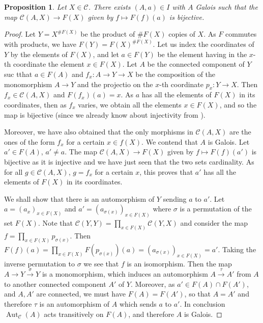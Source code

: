 \documentclass[10pt]{article}
\theoremstyle{thmstyle}
\newtheorem{proposition}[theorem]{Proposition}
\theoremstyle{defstyle}
\newcommand{\Aut}{\operatorname{Aut}}
\newcommand{\scrC}{\mathscr{C}} %
\begin{document}
\begin{proposition}
    Let $X\in\scrC$. There exists $(A, a)\in I$ with $A$ Galois such that the map $\scrC(A, X)\to F(X)$ given by $f\mapsto F(f)(a)$ is bijective.
\end{proposition}
\begin{proof}
    Let $Y = X^{\# F(X)}$ be the product of $\# F(X)$ copies of $X$. As $F$ commutes with products, we have $F(Y) = F(X)^{\# F(X)}$. Let us index the coordinates of $Y$ by the elements of $F(X)$, and let $a\in F(Y)$ be the element having in the $x$-th coordinate the element $x\in F(X)$. Let $A$ be the connected component of $Y$ suc tthat $a\in F(A)$ and $f_x: A\to Y\to X$ be the composition of the monomorphism $A\to Y$ and the projectio on the $x$-th coordinate $p_x: Y\to X$. Then $f_x\in\scrC(A, X)$ and $F(f_x)(a) = x$. As $a$ has all the elements of $F(X)$ in its coordinates, then as $f_x$ varies, we obtain all the elements $x\in F(X)$, and so the map is bijective (since we already know about injectivity from ).

    Moreover, we have also obtained that the only morphisms in $\scrC(A, X)$ are the ones of the form $f_x$ for a certain $x\in f(X)$. We contend that $A$ is Galois. Let $a'\in F(A)$, $a'\ne a$. The map $\scrC(A, X)\to F(X)$ given by $f\mapsto F(f)(a')$ is bijective as it is injective and we have just seen that the two sets cardinality. As for all $g\in\scrC(A, X)$, $g = f_x$ for a certain $x$, this proves that $a'$ has all the elements of $F(X)$ in its coordinates. 

    We shall show that there is an automorphism of $Y$ sending $a$ to $a'$. Let $a = (a_x)_{x\in F(X)}$ and $a' = (a_{\sigma(x)})_{x\in F(X)}$ where $\sigma$ is a permutation of the set $F(X)$. Note that $\scrC(Y, Y) = \prod_{x\in F(X)}\scrC(Y, X)$ and consider the map $f = \prod_{x\in F(X)}p_{\sigma(x)}$. Then $F(f)(a) = \prod_{x\in F(X)} F(p_{\sigma(x)})(a) = (a_{\sigma(x)})_{x\in F(X)} = a'$. Taking the inverse permutation to $\sigma$ we see that $f$ is an isomorphism. Then the map $A\to Y\xrightarrow{\sigma} Y$ is a monomorphism, which induces an automorphism $A\xrightarrow{\tau} A'$ from $A$ to another connected component $A'$ of $Y$. Moreover, as $a'\in F(A)\cap F(A')$, and $A, A'$ are connected, we must have $F(A) = F(A')$, so that $A = A'$ and therefore $\tau$ is an automorphism of $A$ which sends $a$ to $a'$. In  conclusion $\Aut_{\scrC}(A)$ acts transitively on $F(A)$, and therefore $A$ is Galois.
\end{proof}
\end{document}
